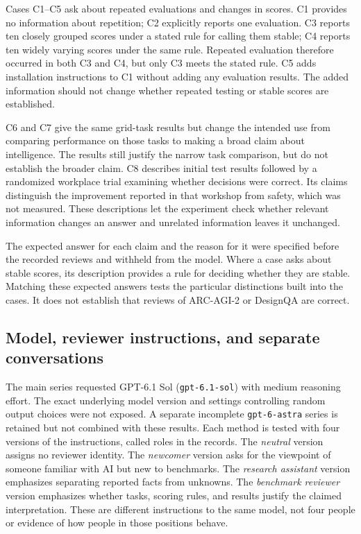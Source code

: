 \documentclass[10pt,conference]{IEEEtran}
\begin{document}
Cases C1--C5 ask about repeated evaluations and changes in scores. C1 provides no information about repetition; C2 explicitly reports one evaluation. C3 reports ten closely grouped scores under a stated rule for calling them stable; C4 reports ten widely varying scores under the same rule. Repeated evaluation therefore occurred in both C3 and C4, but only C3 meets the stated rule. C5 adds installation instructions to C1 without adding any evaluation results. The added information should not change whether repeated testing or stable scores are established.

C6 and C7 give the same grid-task results but change the intended use from comparing performance on those tasks to making a broad claim about intelligence. The results still justify the narrow task comparison, but do not establish the broader claim. C8 describes initial test results followed by a randomized workplace trial examining whether decisions were correct. Its claims distinguish the improvement reported in that workshop from safety, which was not measured. These descriptions let the experiment check whether relevant information changes an answer and unrelated information leaves it unchanged.

The expected answer for each claim and the reason for it were specified before the recorded reviews and withheld from the model. Where a case asks about stable scores, its description provides a rule for deciding whether they are stable. Matching these expected answers tests the particular distinctions built into the cases. It does not establish that reviews of ARC-AGI-2 or DesignQA are correct.

\subsection{Model, reviewer instructions, and separate conversations}
The main series requested GPT-6.1 Sol (\texttt{gpt-6.1-sol}) with medium reasoning effort. The exact underlying model version and settings controlling random output choices were not exposed. A separate incomplete \texttt{gpt-6-astra} series is retained but not combined with these results. Each method is tested with four versions of the instructions, called roles in the records. The \emph{neutral} version assigns no reviewer identity. The \emph{newcomer} version asks for the viewpoint of someone familiar with AI but new to benchmarks. The \emph{research assistant} version emphasizes separating reported facts from unknowns. The \emph{benchmark reviewer} version emphasizes whether tasks, scoring rules, and results justify the claimed interpretation. These are different instructions to the same model, not four people or evidence of how people in those positions behave.
\end{document}
